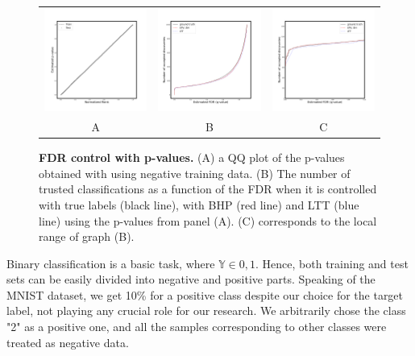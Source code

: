 \documentclass{article}
\begin{document}
\begin{figure}
    \centering
        \begin{tabular}{ccc}
 		\includegraphics[width=2in]{img/cnn_QQ_classical.png} &
		\includegraphics[width=2in]{img/cnn_classical_fdr_control.png} & 
            \includegraphics[width=2in]{img/cnn_classical_fdr_control_loc.png}
		\\	
		A & B & C
	\end{tabular}
	\caption{{\bf  FDR control with p-values.}
        (A) a QQ plot of the p-values obtained with using negative training data. (B) The number of trusted classifications as a function of the FDR when it is controlled with true labels (black line), with BHP (red line) and LTT (blue line) using the p-values from panel (A).
        (C) corresponds to the local range of graph (B).
        }
	\label{fig:classical}
\end{figure}

Binary classification is a basic task, where $\mathbb{Y} \in {0, 1}$. Hence, both training and test sets can be easily divided into negative and positive parts. Speaking of the MNIST dataset, we get 10\% for a positive class despite our choice for the target label, not playing any crucial role for our research. We arbitrarily chose the class "2" as a positive one, and all the samples corresponding to other classes were treated as negative data. 
\end{document}
